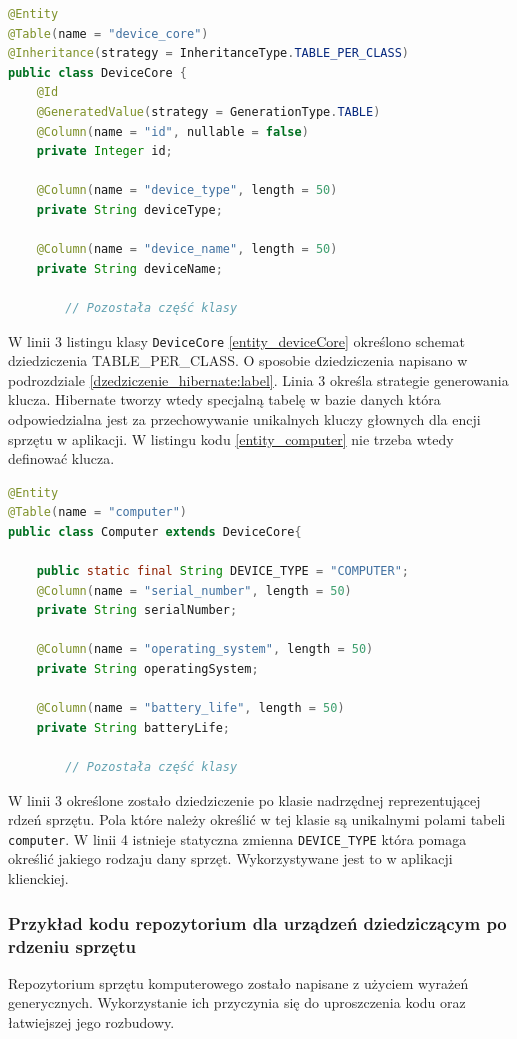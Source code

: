\begin{lstlisting}[language=Java, style=JavaStyle, caption={Klasa nadrzędna reprezentująca rdzeń sprzętu: DeviceCore}, label={entity_deviceCore}]
@Entity
@Table(name = "device_core")
@Inheritance(strategy = InheritanceType.TABLE_PER_CLASS)
public class DeviceCore {
    @Id
    @GeneratedValue(strategy = GenerationType.TABLE)
    @Column(name = "id", nullable = false)
    private Integer id;

    @Column(name = "device_type", length = 50)
    private String deviceType;

    @Column(name = "device_name", length = 50)
    private String deviceName;
		
		// Pozostała część klasy

\end{lstlisting}
W linii 3 listingu klasy \texttt{DeviceCore} \ref{entity_deviceCore} określono schemat dziedziczenia TABLE\_PER\_CLASS. O sposobie dziedziczenia napisano w podrozdziale \ref{dzedziczenie_hibernate:label}. Linia 3 określa strategie generowania klucza. Hibernate tworzy wtedy specjalną tabelę w bazie danych która odpowiedzialna jest za przechowywanie unikalnych kluczy głownych dla encji sprzętu w aplikacji. W listingu kodu \ref{entity_computer} nie trzeba wtedy definować klucza.

\begin{lstlisting}[language=Java, style=JavaStyle,  caption={Klasa potomna: Computer, reprezentująca komputer}, label={entity_computer}]
@Entity
@Table(name = "computer")
public class Computer extends DeviceCore{

    public static final String DEVICE_TYPE = "COMPUTER";
    @Column(name = "serial_number", length = 50)
    private String serialNumber;

    @Column(name = "operating_system", length = 50)
    private String operatingSystem;

    @Column(name = "battery_life", length = 50)
    private String batteryLife;
		
		// Pozostała część klasy
\end{lstlisting}
W linii 3 określone zostało dziedziczenie po klasie nadrzędnej reprezentującej rdzeń sprzętu. Pola które należy określić w tej klasie są unikalnymi polami tabeli \texttt{computer}. W linii 4 istnieje statyczna zmienna \texttt{DEVICE\_TYPE} która pomaga określić jakiego rodzaju dany sprzęt. Wykorzystywane jest to w aplikacji klienckiej.


\subsubsection{Przykład kodu repozytorium dla urządzeń dziedziczącym po rdzeniu sprzętu}
Repozytorium sprzętu komputerowego zostało napisane z użyciem wyrażeń generycznych. Wykorzystanie ich przyczynia się do uproszczenia kodu oraz łatwiejszej jego rozbudowy.

